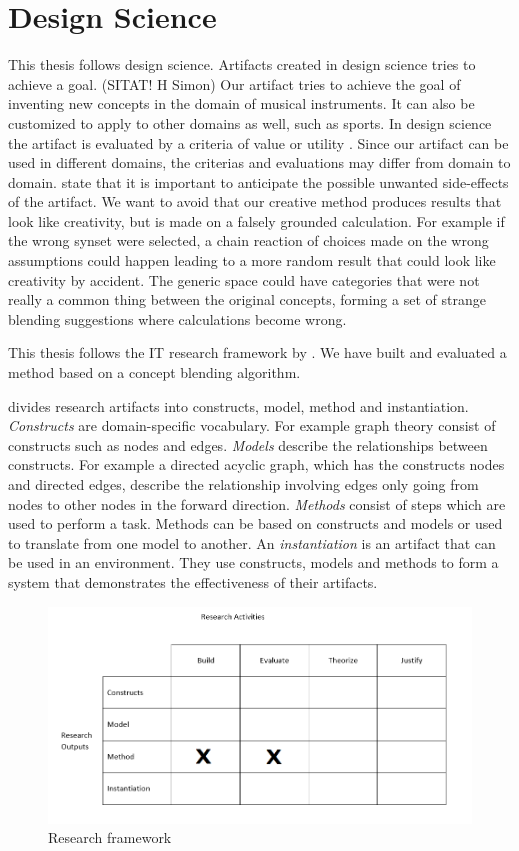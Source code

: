 \section{Design Science}
This thesis follows design science. Artifacts created in design science tries to achieve a goal. (SITAT! H Simon) Our artifact tries to achieve the goal of inventing new concepts in the domain of musical instruments. It can also be customized to apply to other domains as well, such as sports. In design science the artifact is evaluated by a criteria of value or utility \parencite{march1995design}. Since our artifact can be used in different domains, the criterias and evaluations may differ from domain to domain. \citet{march1995design} state that it is important to anticipate the possible unwanted side-effects of the artifact. We want to avoid that our creative method produces results that look like creativity, but is made on a falsely grounded calculation. For example if the wrong synset were selected, a chain reaction of choices made on the wrong assumptions could happen leading to a more random result that could look like creativity by accident. The generic space could  have categories that were not really a common thing between the original concepts, forming a set of strange blending suggestions where calculations become wrong.

This thesis follows the IT research framework by \citet{march1995design}. We have built and evaluated a method based on a concept blending algorithm.

\citet{march1995design} divides research artifacts into constructs, model, method and instantiation.
\emph{Constructs} are domain-specific vocabulary. For example graph theory consist of constructs such as nodes and edges.
\emph{Models} describe the relationships between constructs. For example a directed acyclic graph, which has the constructs nodes and directed edges, describe the relationship involving edges only going from nodes to other nodes in the forward direction.
\emph{Methods} consist of steps which are used to perform a task. Methods can be based on constructs and models or used to translate from one model to another.
An \emph{instantiation} is an artifact that can be used in an environment. They use constructs, models and methods to form a system that demonstrates the effectiveness of their artifacts.
\begin{figure}
\centering
\includegraphics[width=1\linewidth]{"Figures/design science figur"}
\caption{Research framework \parencite{march1995designfigure}}
\label{fig:design-science-figur}
\end{figure}


